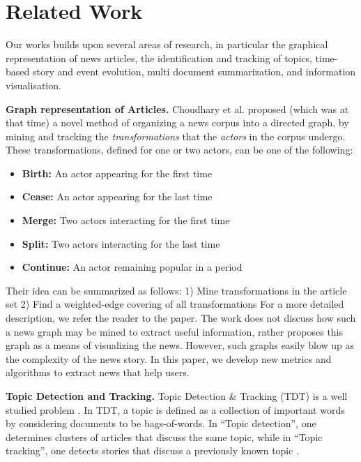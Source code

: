 \section{Related Work}
\label{sec:related}

Our works builds upon several areas of research, in particular the graphical representation of news articles, the identification and tracking of topics, time-based story and event evolution, multi document summarization, and information visualisation.

\textbf{Graph representation of Articles.} Choudhary et al.\cite{choudhary@ecir2008} proposed (which was at that time) a novel method of organizing a news corpus into a directed graph, by mining and tracking the \emph{transformations} that the \emph{actors} in the corpus undergo. These transformations, defined for one or two actors, can be one of the following:
\begin{itemize}
  \item \textbf{Birth:} An actor appearing for the first time
  \item \textbf{Cease:} An actor appearing for the last time
  \item \textbf{Merge:} Two actors interacting for the first time
  \item \textbf{Split:} Two actors interacting for the last time
  \item \textbf{Continue:} An actor remaining popular in a period
\end{itemize}
Their idea can be summarized as follows: 1) Mine transformations in the article set 2) Find a weighted-edge covering of all transformations
For a more detailed description, we refer the reader to the paper. The work does not discuss how such a news graph may be mined to extract
useful information, rather proposes this graph as a means of visualizing the news. However, such graphs easily blow up as the complexity
of the news story. In this paper, we develop new metrics and algorithms to extract news that help users.

\textbf{Topic Detection and Tracking.} Topic Detection \& Tracking (TDT) is a well studied problem \cite{springerlink:10.1023/B:INRT.0000011210.12953.86, springerlink:10.1007, Franz:2001:USC:383952.384013}. In TDT, a topic is defined as a collection of important words by considering documents to be bags-of-words. In ``Topic detection'', one determines clusters of articles that discuss the same topic, while in ``Topic tracking'', one detects stories that discuss a previously known topic \cite{Allan:2002:TDT:772260}. 

